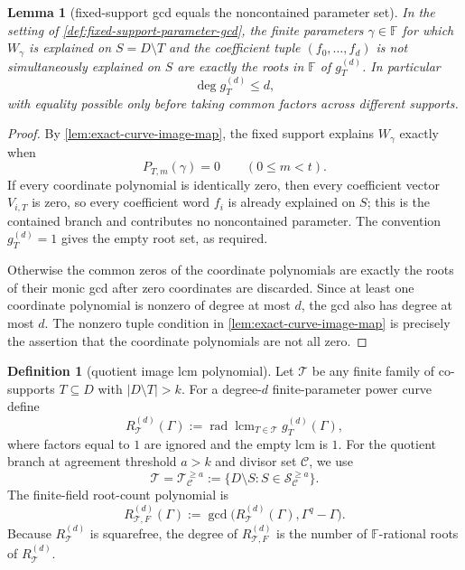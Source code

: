 \documentclass[11pt]{article}
\newtheorem{lemma}[theorem]{Lemma}
\theoremstyle{definition}
\newtheorem{definition}[theorem]{Definition}
\theoremstyle{remark}
\newcommand{\F}{\mathbb{F}}
\begin{document}
\begin{lemma}[fixed-support gcd equals the noncontained parameter set]
\label{lem:fixed-support-gcd-exact}
In the setting of \cref{def:fixed-support-parameter-gcd}, the finite parameters
$\gamma\in\F$ for which $W_\gamma$ is explained on $S=D\setminus T$ and the
coefficient tuple $(f_0,\ldots,f_d)$ is not simultaneously explained on $S$ are
exactly the roots in $\F$ of $g_T^{(d)}$.  In particular
\[
        \deg g_T^{(d)}\le d,
\]
with equality possible only before taking common factors across different
supports.
\end{lemma}

\begin{proof}
By \cref{lem:exact-curve-image-map}, the fixed support explains $W_\gamma$ exactly
when
\[
        P_{T,m}(\gamma)=0\qquad(0\le m<t).
\]
If every coordinate polynomial is identically zero, then every coefficient
vector $V_{i,T}$ is zero, so every coefficient word $f_i$ is already explained on
$S$; this is the contained branch and contributes no noncontained parameter.
The convention $g_T^{(d)}=1$ gives the empty root set, as required.

Otherwise the common zeros of the coordinate polynomials are exactly the roots
of their monic gcd after zero coordinates are discarded.  Since at least one
coordinate polynomial is nonzero of degree at most $d$, the gcd also has degree
at most $d$.  The nonzero tuple condition in \cref{lem:exact-curve-image-map} is
precisely the assertion that the coordinate polynomials are not all zero.
\end{proof}

\begin{definition}[quotient image lcm polynomial]
\label{def:quotient-image-lcm-polynomial}
Let $\mathcal T$ be any finite family of co-supports $T\subseteq D$ with
$|D\setminus T|>k$.  For a degree-$d$ finite-parameter power curve define
\[
        R_{\mathcal T}^{(d)}(\Gamma)
        :=\operatorname{rad}\operatorname{lcm}_{T\in\mathcal T} g_T^{(d)}(\Gamma),
\]
where factors equal to $1$ are ignored and the empty lcm is $1$.  For the quotient branch at agreement
threshold $a>k$ and divisor set $\mathcal C$, we use
\[
        \mathcal T=\mathcal T_{\mathcal C}^{\ge a}
        :=\{D\setminus S:S\in\mathcal S_{\mathcal C}^{\ge a}\}.
\]
The finite-field root-count polynomial is
\[
        R_{\mathcal T,F}^{(d)}(\Gamma)
        :=\gcd\bigl(R_{\mathcal T}^{(d)}(\Gamma),\Gamma^q-\Gamma\bigr).
\]
Because $R_{\mathcal T}^{(d)}$ is squarefree, the degree of
$R_{\mathcal T,F}^{(d)}$ is the number of $\F$-rational roots of
$R_{\mathcal T}^{(d)}$.
\end{definition}
\end{document}
